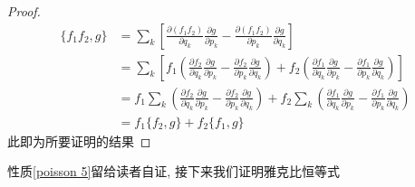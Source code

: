 \documentclass[a4paper,11pt]{article}
\newtheorem{proof}{证明}[section]
\begin{document}
\begin{proof}
  \begin{equation*}
    \begin{split}
       \{f_1f_2,g\}&=\sum_{k}\left[\frac{\partial{(f_1f_2)}}{\partial{q_k}}\frac{\partial g}{\partial{p_k}}-\frac{\partial{(f_1f_2)}}{\partial{p_k}}\frac{\partial g}{\partial{q_k}}\right]\\
         &=\sum_{k}\left[f_1\left(\frac{\partial{f_2}}{\partial{q_k}}\frac{\partial g}{\partial{p_k}}-\frac{\partial{f_2}}{\partial{p_k}}\frac{\partial g}{\partial{q_k}}\right)+f_2\left(\frac{\partial{f_1}}{\partial{q_k}}\frac{\partial g}{\partial{p_k}}-\frac{\partial{f_1}}{\partial{p_k}}\frac{\partial g}{\partial{q_k}}\right)\right]\\
         &=f_1\sum_{k}\left(\frac{\partial{f_2}}{\partial{q_k}}\frac{\partial g}{\partial{p_k}}-\frac{\partial{f_2}}{\partial{p_k}}\frac{\partial g}{\partial{q_k}}\right)+f_2\sum_{k}\left(\frac{\partial{f_1}}{\partial{q_k}}\frac{\partial g}{\partial{p_k}}-\frac{\partial{f_1}}{\partial{p_k}}\frac{\partial g}{\partial{q_k}}\right) \\
         &=f_1\{f_2,g\}+f_2\{f_1,g\}
    \end{split}
  \end{equation*}
  此即为所要证明的结果
\end{proof}
性质\ref{poisson 5}留给读者自证, 接下来我们证明雅克比恒等式
\end{document}
